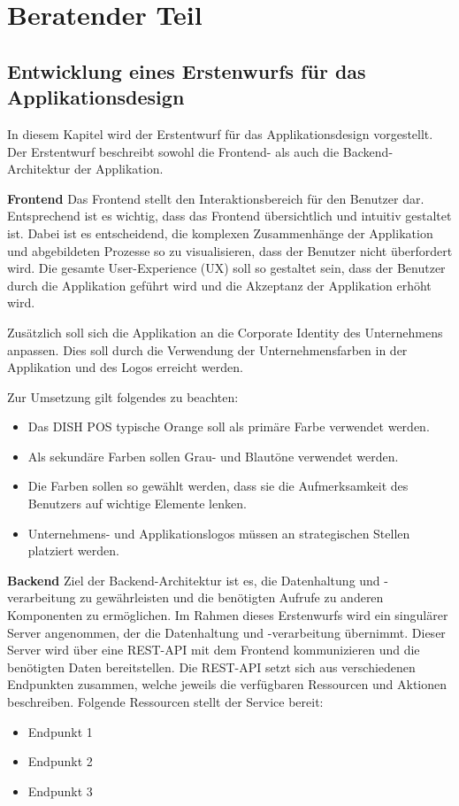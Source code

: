 \newpage
\section{Beratender Teil} \label{sec:beratender-teil}

\subsection{Entwicklung eines Erstenwurfs für das Applikationsdesign}\label{subsec:entwicklung-eines-erstenwurfs-fuer-das-applikationsdesign}
In diesem Kapitel wird der Erstentwurf für das Applikationsdesign vorgestellt.
Der Erstentwurf beschreibt sowohl die Frontend- als auch die Backend-Architektur der Applikation.

\textbf{Frontend}
Das Frontend stellt den Interaktionsbereich für den Benutzer dar.
Entsprechend ist es wichtig, dass das Frontend übersichtlich und intuitiv gestaltet ist.
Dabei ist es entscheidend, die komplexen Zusammenhänge der Applikation und abgebildeten Prozesse so zu visualisieren, dass der Benutzer nicht überfordert wird.
Die gesamte User-Experience (UX) soll so gestaltet sein, dass der Benutzer durch die Applikation geführt wird und die Akzeptanz der Applikation erhöht wird.

Zusätzlich soll sich die Applikation an die Corporate Identity des Unternehmens anpassen.
Dies soll durch die Verwendung der Unternehmensfarben in der Applikation und des Logos erreicht werden.

Zur Umsetzung gilt folgendes zu beachten:
\begin{itemize}
    \item Das DISH POS typische Orange soll als primäre Farbe verwendet werden.
    \item Als sekundäre Farben sollen Grau- und Blautöne verwendet werden.
    \item Die Farben sollen so gewählt werden, dass sie die Aufmerksamkeit des Benutzers auf wichtige Elemente lenken.
    \item Unternehmens- und Applikationslogos müssen an strategischen Stellen platziert werden.
\end{itemize}

\textbf{Backend}
Ziel der Backend-Architektur ist es, die Datenhaltung und -verarbeitung zu gewährleisten und die benötigten Aufrufe zu anderen Komponenten zu ermöglichen.
Im Rahmen dieses Erstenwurfs wird ein singulärer Server angenommen, der die Datenhaltung und -verarbeitung übernimmt.
Dieser Server wird über eine REST-API mit dem Frontend kommunizieren und die benötigten Daten bereitstellen.
Die REST-API setzt sich aus verschiedenen Endpunkten zusammen, welche jeweils die verfügbaren Ressourcen und Aktionen beschreiben.
Folgende Ressourcen stellt der Service bereit:
\begin{itemize}
    \item Endpunkt 1
    \item Endpunkt 2
    \item Endpunkt 3
\end{itemize}

